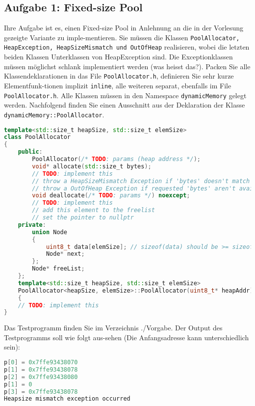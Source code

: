 \subsection{Aufgabe 1: Fixed-size Pool}

Ihre Aufgabe ist es, einen Fixed-size Pool in Anlehnung an die in der Vorlesung gezeigte Variante zu imple-mentieren. Sie müssen die Klassen \texttt{PoolAllocator, HeapException, HeapSizeMismatch und OutOfHeap} realisieren, wobei die letzten beiden Klassen Unterklassen von HeapException sind. Die Exceptionklassen müssen möglichst schlank implementiert werden (was heisst das?).
Packen Sie alle Klassendeklarationen in das File \texttt{PoolAllocator.h}, definieren Sie sehr kurze Elementfunk-tionen implizit \texttt{inline}, alle weiteren separat, ebenfalls im File \texttt{PoolAllocator.h}. Alle Klassen müssen in den Namespace \texttt{dynamicMemory} gelegt werden. Nachfolgend finden Sie einen Ausschnitt aus der Deklaration der Klasse \texttt{dynamicMemory::PoolAllocator}.

\begin{lstlisting}[language=C++, style=C++]
template<std::size_t heapSize, std::size_t elemSize>
class PoolAllocator
{
    public:
        PoolAllocator(/* TODO: params (heap address */);
        void* allocate(std::size_t bytes);
        // TODO: implement this
        // throw a HeapSizeMismatch Exception if 'bytes' doesn't match elemSize
        // throw a OutOfHeap Exception if requested 'bytes' aren't available
        void deallocate(/* TODO: params */) noexcept;
        // TODO: implement this
        // add this element to the freelist
        // set the pointer to nullptr
    private:
        union Node
        {
            uint8_t data[elemSize]; // sizeof(data) should be >= sizeof(Node*)
            Node* next;
        };
        Node* freeList;
    };
    template<std::size_t heapSize, std::size_t elemSize>
    PoolAllocator<heapSize, elemSize>::PoolAllocator(uint8_t* heapAddr)
    {
    // TODO: implement this
}
\end{lstlisting}

Das Testprogramm finden Sie im Verzeichnis ./Vorgabe. Der Output des Testprogramms soll wie folgt aus-sehen (Die Anfangsadresse kann unterschiedlich sein):

\begin{lstlisting}[language=C++, style=C++]
p[0] = 0x7ffe93438070
p[1] = 0x7ffe93438078
p[2] = 0x7ffe93438080
p[1] = 0
p[3] = 0x7ffe93438078
Heapsize mismatch exception occurred
\end{lstlisting}


